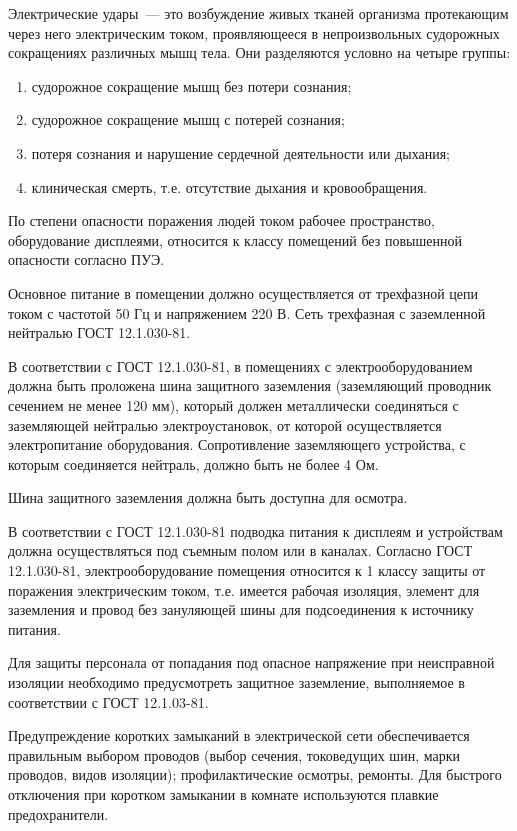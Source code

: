 Электрические удары~--- это возбуждение живых тканей организма протекающим через него электрическим током, проявляющееся в непроизвольных судорожных сокращениях различных мышц тела.
Они разделяются условно на четыре группы:
\begin{enumerate}
  \item{судорожное сокращение мышц без потери сознания;}
  \item{судорожное сокращение мышц с потерей сознания;}
  \item{потеря сознания и нарушение сердечной деятельности или дыхания;}
  \item{клиническая смерть, т.е. отсутствие дыхания и кровообращения.}
\end{enumerate}

По степени опасности поражения людей током рабочее пространство, оборудование дисплеями, относится к классу помещений без повышенной опасности согласно ПУЭ.

Основное питание в помещении должно осуществляется от трехфазной цепи током с частотой 50 Гц и напряжением 220 В.
Сеть трехфазная с заземленной нейтралью ГОСТ 12.1.030-81.

В соответствии с ГОСТ 12.1.030-81, в помещениях с электрооборудованием должна быть проложена шина защитного заземления (заземляющий проводник сечением не менее 120 мм), который должен металлически соединяться с заземляющей нейтралью электроустановок, от которой осуществляется электропитание оборудования.
Сопротивление заземляющего устройства, с которым соединяется нейтраль, должно быть не более 4 Ом.

Шина защитного заземления должна быть доступна для осмотра.

В соответствии с ГОСТ 12.1.030-81 подводка питания к дисплеям и устройствам должна осуществляться под съемным полом или в каналах.
Согласно ГОСТ 12.1.030-81, электрооборудование помещения относится к 1 классу защиты от поражения электрическим током, т.е. имеется рабочая изоляция, элемент для заземления и провод без зануляющей шины для подсоединения к источнику питания.

Для защиты персонала от попадания под опасное напряжение при неисправной изоляции необходимо предусмотреть защитное заземление, выполняемое в соответствии с ГОСТ 12.1.03-81.

Предупреждение коротких замыканий в электрической сети обеспечивается правильным выбором проводов (выбор сечения, токоведущих шин, марки проводов, видов изоляции); профилактические осмотры, ремонты.
Для быстрого отключения при коротком замыкании в комнате используются плавкие предохранители.

